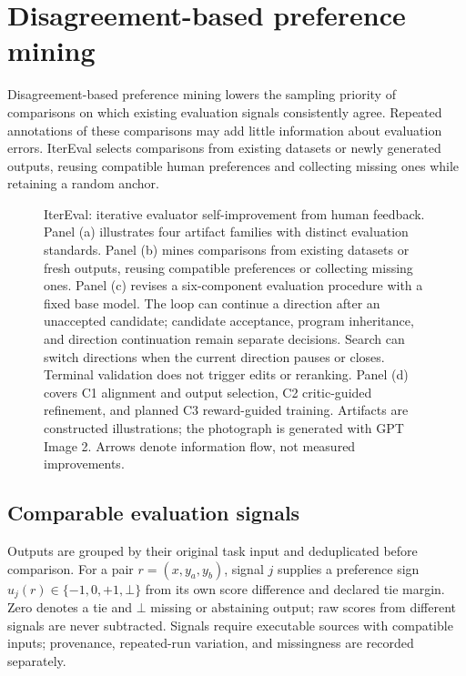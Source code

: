 \section{Disagreement-based preference mining}
\label{sec:mining}

Disagreement-based preference mining lowers the sampling priority of comparisons on which existing evaluation signals consistently agree.
Repeated annotations of these comparisons may add little information about evaluation errors.
IterEval selects comparisons from existing datasets or newly generated outputs, reusing compatible human preferences and collecting missing ones while retaining a random anchor.

\begin{figure}[t]
\centering

\caption{IterEval: iterative evaluator self-improvement from human feedback.
Panel (a) illustrates four artifact families with distinct evaluation standards.
Panel (b) mines comparisons from existing datasets or fresh outputs, reusing compatible preferences or collecting missing ones.
Panel (c) revises a six-component evaluation procedure with a fixed base model.
The loop can continue a direction after an unaccepted candidate; candidate acceptance, program inheritance, and direction continuation remain separate decisions.
Search can switch directions when the current direction pauses or closes.
Terminal validation does not trigger edits or reranking.
Panel (d) covers C1 alignment and output selection, C2 critic-guided refinement, and planned C3 reward-guided training.
Artifacts are constructed illustrations; the photograph is generated with GPT Image 2.
Arrows denote information flow, not measured improvements.}
\label{fig:overview}
\end{figure}

\subsection{Comparable evaluation signals}

Outputs are grouped by their original task input and deduplicated before comparison.
For a pair $r=(x,y_a,y_b)$, signal $j$ supplies a preference sign $u_j(r)\in\{-1,0,+1,\bot\}$ from its own score difference and declared tie margin.
Zero denotes a tie and $\bot$ missing or abstaining output; raw scores from different signals are never subtracted.
Signals require executable sources with compatible inputs; provenance, repeated-run variation, and missingness are recorded separately.

